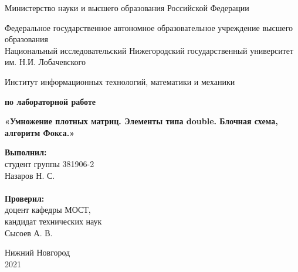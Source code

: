 \documentclass{report}
\begin{document}
\begin{titlepage}

\begin{center}
Министерство науки и высшего образования Российской Федерации
\end{center}

\begin{center}
Федеральное государственное автономное образовательное учреждение высшего образования \\
Национальный исследовательский Нижегородский государственный университет им. Н.И. Лобачевского
\end{center}

\begin{center}
Институт информационных технологий, математики и механики
\end{center}

\vspace{4em}

\begin{center}
\textbf{ по лабораторной работе} \\
\end{center}
\begin{center}
\textbf{\Large«Умножение плотных матриц. Элементы типа double. Блочная схема, алгоритм Фокса.»} \\
\end{center}

\vspace{4em}

\newbox{\lbox}
\newlength{\maxl}
\setlength{\maxl}{\wd\lbox}
\hfill\parbox{7cm}{
\hspace*{5cm}\hspace*{-5cm}\textbf{Выполнил:} \\ студент группы 381906-2 \\ Назаров Н. С.\\
\\
\hspace*{5cm}\hspace*{-5cm}\textbf{Проверил:}\\ доцент кафедры МОСТ, \\ кандидат технических наук \\ Сысоев А. В.\\
}
\vspace{\fill}

\begin{center} Нижний Новгород \\ 2021 \end{center}

\end{titlepage}
\end{document}
